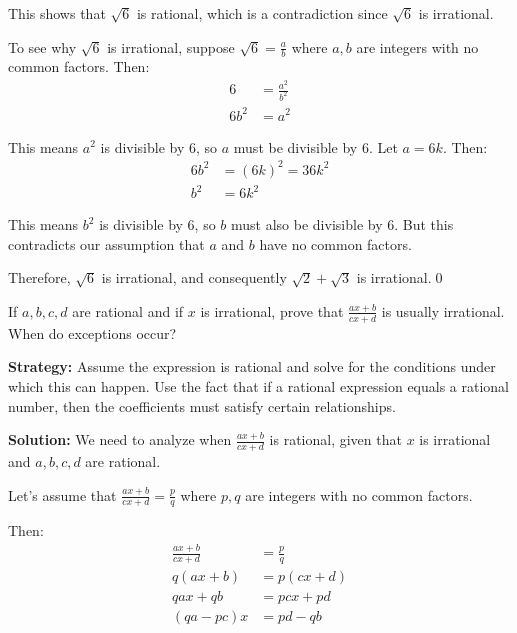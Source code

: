 This shows that $\sqrt{6}$ is rational, which is a contradiction since $\sqrt{6}$ is irrational.

To see why $\sqrt{6}$ is irrational, suppose $\sqrt{6} = \frac{a}{b}$ where $a, b$ are integers with no common factors. Then:
\begin{align*}
6 &= \frac{a^2}{b^2} \\
6b^2 &= a^2
\end{align*}

This means $a^2$ is divisible by 6, so $a$ must be divisible by 6. Let $a = 6k$. Then:
\begin{align*}
6b^2 &= (6k)^2 = 36k^2 \\
b^2 &= 6k^2
\end{align*}

This means $b^2$ is divisible by 6, so $b$ must also be divisible by 6. But this contradicts our assumption that $a$ and $b$ have no common factors.

Therefore, $\sqrt{6}$ is irrational, and consequently $\sqrt{2} + \sqrt{3}$ is irrational.\qed


\begin{problembox}
\begin{problemstatement}
If $a, b, c, d$ are rational and if $x$ is irrational, prove that $\frac{ax + b}{cx + d}$ is usually irrational. When do exceptions occur?
\end{problemstatement}
\end{problembox}

\noindent\textbf{Strategy:} Assume the expression is rational and solve for the conditions under which this can happen. Use the fact that if a rational expression equals a rational number, then the coefficients must satisfy certain relationships.

\bigskip\noindent\textbf{Solution:}
We need to analyze when $\frac{ax + b}{cx + d}$ is rational, given that $x$ is irrational and $a, b, c, d$ are rational.

Let's assume that $\frac{ax + b}{cx + d} = \frac{p}{q}$ where $p, q$ are integers with no common factors.

Then:
\begin{align*}
\frac{ax + b}{cx + d} &= \frac{p}{q} \\
q(ax + b) &= p(cx + d) \\
qax + qb &= pcx + pd \\
(qa - pc)x &= pd - qb
\end{align*}

